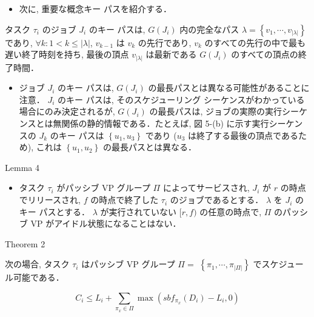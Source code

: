 \begin{frame}{}
    \begin{itemize}
        \item 次に, 重要な概念キー パスを紹介する．
    \end{itemize}
\end{frame}

\begin{frame}{}
    \begin{definition}[キーパス]
        タスク $\tau_{i}$ のジョブ $J_{i}$ のキー パスは, $G\left(J_{i}\right)$ 内の完全なパス $\lambda=\left\{v_{1}, \cdots, v_{|\lambda|}\right\}$ であり, $\forall k: 1<k \leq|\lambda|$, $v_{k-1}$ は $v_{k}$ の先行であり, $v_{k}$ のすべての先行の中で最も遅い終了時刻を持ち, 最後の頂点 $v_{|\lambda|}$ は最新である $G\left(J_{i}\right)$ のすべての頂点の終了時間．
    \end{definition}
\end{frame}

\begin{frame}{}
    \begin{itemize}
        \item ジョブ $J_{i}$ のキー パスは, $G\left(J_{i}\right)$ の最長パスとは異なる可能性があることに注意． $J_{i}$ のキー パスは, そのスケジューリング シーケンスがわかっている場合にのみ決定されるが, $G\left(J_{i}\right)$ の最長パスは, ジョブの実際の実行シーケンスとは無関係の静的情報である．たとえば, 図 5-(b) に示す実行シーケンスの $J_{k}$ のキー パスは $\left\{u_{1}, u_{3}\right\}$ であり ($u_{3}$ は終了する最後の頂点であるため), これは $\left\{u_{1}, u_{2}\right\}$ の最長パスとは異なる．
    \end{itemize}
\end{frame}

\begin{frame}[label=lemma4]{Lemma 4}
    \begin{lemma}[]
        \begin{itemize}
            \item タスク $\tau_{i}$ がパッシブ VP グループ $\Pi$ によってサービスされ, $J_{i}$ が $r$ の時点でリリースされ, $f$ の時点で終了した $\tau_{i}$ のジョブであるとする． $\lambda$ を $J_{i}$ のキー パスとする． $\lambda$ が実行されていない $[r, f)$ の任意の時点で, $\Pi$ のパッシブ VP がアイドル状態になることはない．
        \end{itemize}
    \end{lemma}
\end{frame}

\begin{frame}[label=theorem2]{Theorem 2}
    \begin{theorem}[]
        次の場合, タスク $\tau_{i}$ はパッシブ VP グループ $\Pi=$  $\left\{\pi_{1}, \cdots, \pi_{|\Pi|}\right\}$ でスケジュール可能である．

        \begin{equation*}
            C_{i} \leq L_{i}+\sum_{\pi_{x} \in \Pi} \max \left(s b f_{\pi_{x}}\left(D_{i}\right)-L_{i}, 0\right)
        \end{equation*}
    \end{theorem}
\end{frame}
